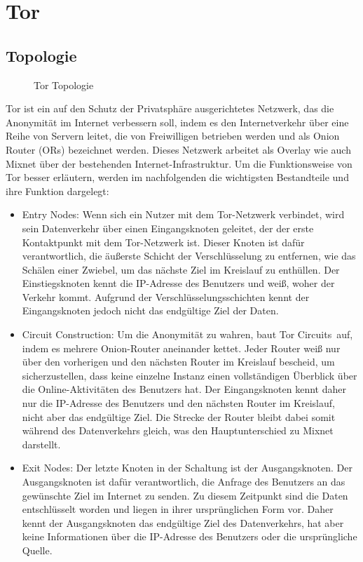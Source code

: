 \section{Tor}
\label{chap:tor}

\subsection{Topologie}
\label{chap:tor_topology}

\begin{figure}[h!]
    \centering
    
    \caption{Tor Topologie}
    \label{imgs:tor}
\end{figure}

Tor ist ein auf den Schutz der Privatsphäre ausgerichtetes Netzwerk, das die Anonymität im Internet verbessern soll, indem es den Internetverkehr über eine Reihe von Servern leitet, die von Freiwilligen betrieben werden und als Onion Router (ORs) bezeichnet werden. Dieses Netzwerk arbeitet als Overlay wie auch Mixnet über der bestehenden Internet-Infrastruktur. Um die Funktionsweise von Tor besser erläutern, werden im nachfolgenden die wichtigsten Bestandteile und ihre Funktion dargelegt:

\begin{itemize}
    \item Entry Nodes: Wenn sich ein Nutzer mit dem Tor-Netzwerk verbindet, wird sein Datenverkehr über einen Eingangsknoten geleitet, der der erste Kontaktpunkt mit dem Tor-Netzwerk ist. Dieser Knoten ist dafür verantwortlich, die äußerste Schicht der Verschlüsselung zu entfernen, wie das Schälen einer Zwiebel, um das nächste Ziel im Kreislauf zu enthüllen. Der Einstiegsknoten kennt die IP-Adresse des Benutzers und weiß, woher der Verkehr kommt. Aufgrund der Verschlüsselungsschichten kennt der Eingangsknoten jedoch nicht das endgültige Ziel der Daten.
    \item Circuit Construction: Um die Anonymität zu wahren, baut Tor \glqq Circuits\grqq\ auf, indem es mehrere Onion-Router aneinander kettet. Jeder Router weiß nur über den vorherigen und den nächsten Router im Kreislauf bescheid, um sicherzustellen, dass keine einzelne Instanz einen vollständigen Überblick über die Online-Aktivitäten des Benutzers hat. Der Eingangsknoten kennt daher nur die IP-Adresse des Benutzers und den nächsten Router im Kreislauf, nicht aber das endgültige Ziel. Die Strecke der Router bleibt dabei somit während des Datenverkehrs gleich, was den Hauptunterschied zu Mixnet darstellt.
    \item Exit Nodes: Der letzte Knoten in der Schaltung ist der Ausgangsknoten. Der Ausgangsknoten ist dafür verantwortlich, die Anfrage des Benutzers an das gewünschte Ziel im Internet zu senden. Zu diesem Zeitpunkt sind die Daten entschlüsselt worden und liegen in ihrer ursprünglichen Form vor. Daher kennt der Ausgangsknoten das endgültige Ziel des Datenverkehrs, hat aber keine Informationen über die IP-Adresse des Benutzers oder die ursprüngliche Quelle.
\end{itemize}


